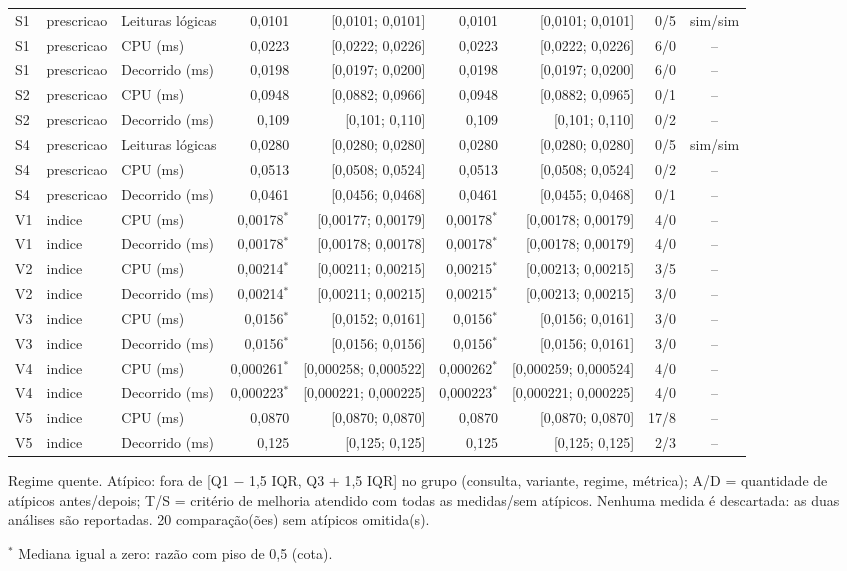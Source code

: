 {\begin{tabular}{lllrrrrrc}
S1 & prescricao & Leituras lógicas & 0,0101 & [0,0101; 0,0101] & 0,0101 & [0,0101; 0,0101] & 0/5 & sim/sim \\
S1 & prescricao & CPU (ms) & 0,0223 & [0,0222; 0,0226] & 0,0223 & [0,0222; 0,0226] & 6/0 & -- \\
S1 & prescricao & Decorrido (ms) & 0,0198 & [0,0197; 0,0200] & 0,0198 & [0,0197; 0,0200] & 6/0 & -- \\
S2 & prescricao & CPU (ms) & 0,0948 & [0,0882; 0,0966] & 0,0948 & [0,0882; 0,0965] & 0/1 & -- \\
S2 & prescricao & Decorrido (ms) & 0,109 & [0,101; 0,110] & 0,109 & [0,101; 0,110] & 0/2 & -- \\
S4 & prescricao & Leituras lógicas & 0,0280 & [0,0280; 0,0280] & 0,0280 & [0,0280; 0,0280] & 0/5 & sim/sim \\
S4 & prescricao & CPU (ms) & 0,0513 & [0,0508; 0,0524] & 0,0513 & [0,0508; 0,0524] & 0/2 & -- \\
S4 & prescricao & Decorrido (ms) & 0,0461 & [0,0456; 0,0468] & 0,0461 & [0,0455; 0,0468] & 0/1 & -- \\
V1 & indice & CPU (ms) & 0,00178$^{*}$ & [0,00177; 0,00179] & 0,00178$^{*}$ & [0,00178; 0,00179] & 4/0 & -- \\
V1 & indice & Decorrido (ms) & 0,00178$^{*}$ & [0,00178; 0,00178] & 0,00178$^{*}$ & [0,00178; 0,00179] & 4/0 & -- \\
V2 & indice & CPU (ms) & 0,00214$^{*}$ & [0,00211; 0,00215] & 0,00215$^{*}$ & [0,00213; 0,00215] & 3/5 & -- \\
V2 & indice & Decorrido (ms) & 0,00214$^{*}$ & [0,00211; 0,00215] & 0,00215$^{*}$ & [0,00213; 0,00215] & 3/0 & -- \\
V3 & indice & CPU (ms) & 0,0156$^{*}$ & [0,0152; 0,0161] & 0,0156$^{*}$ & [0,0156; 0,0161] & 3/0 & -- \\
V3 & indice & Decorrido (ms) & 0,0156$^{*}$ & [0,0156; 0,0156] & 0,0156$^{*}$ & [0,0156; 0,0161] & 3/0 & -- \\
V4 & indice & CPU (ms) & 0,000261$^{*}$ & [0,000258; 0,000522] & 0,000262$^{*}$ & [0,000259; 0,000524] & 4/0 & -- \\
V4 & indice & Decorrido (ms) & 0,000223$^{*}$ & [0,000221; 0,000225] & 0,000223$^{*}$ & [0,000221; 0,000225] & 4/0 & -- \\
V5 & indice & CPU (ms) & 0,0870 & [0,0870; 0,0870] & 0,0870 & [0,0870; 0,0870] & 17/8 & -- \\
V5 & indice & Decorrido (ms) & 0,125 & [0,125; 0,125] & 0,125 & [0,125; 0,125] & 2/3 & -- \\
\bottomrule
\end{tabular}\par
\vspace{3pt}
\begin{minipage}{\linewidth}\footnotesize
Regime quente. Atípico: fora de [Q1 $-$ 1,5 IQR, Q3 + 1,5 IQR] no grupo (consulta, variante, regime, métrica); A/D = quantidade de atípicos antes/depois; T/S = critério de melhoria atendido com todas as medidas/sem atípicos. Nenhuma medida é descartada: as duas análises são reportadas. 20 comparação(ões) sem atípicos omitida(s).\par
$^{*}$ Mediana igual a zero: razão com piso de 0,5 (cota).
\end{minipage}
}
